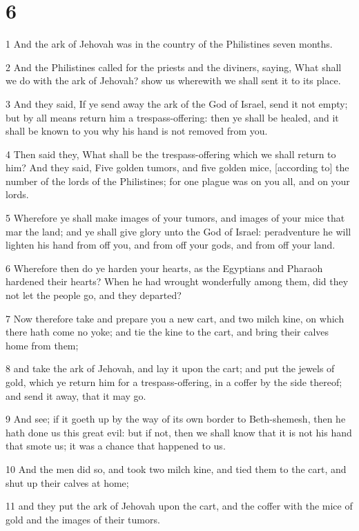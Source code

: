 \chapter{6}

\par 1 And the ark of Jehovah was in the country of the Philistines seven months.
\par 2 And the Philistines called for the priests and the diviners, saying, What shall we do with the ark of Jehovah? show us wherewith we shall sent it to its place.
\par 3 And they said, If ye send away the ark of the God of Israel, send it not empty; but by all means return him a trespass-offering: then ye shall be healed, and it shall be known to you why his hand is not removed from you.
\par 4 Then said they, What shall be the trespass-offering which we shall return to him? And they said, Five golden tumors, and five golden mice, [according to] the number of the lords of the Philistines; for one plague was on you all, and on your lords.
\par 5 Wherefore ye shall make images of your tumors, and images of your mice that mar the land; and ye shall give glory unto the God of Israel: peradventure he will lighten his hand from off you, and from off your gods, and from off your land.
\par 6 Wherefore then do ye harden your hearts, as the Egyptians and Pharaoh hardened their hearts? When he had wrought wonderfully among them, did they not let the people go, and they departed?
\par 7 Now therefore take and prepare you a new cart, and two milch kine, on which there hath come no yoke; and tie the kine to the cart, and bring their calves home from them;
\par 8 and take the ark of Jehovah, and lay it upon the cart; and put the jewels of gold, which ye return him for a trespass-offering, in a coffer by the side thereof; and send it away, that it may go.
\par 9 And see; if it goeth up by the way of its own border to Beth-shemesh, then he hath done us this great evil: but if not, then we shall know that it is not his hand that smote us; it was a chance that happened to us.
\par 10 And the men did so, and took two milch kine, and tied them to the cart, and shut up their calves at home;
\par 11 and they put the ark of Jehovah upon the cart, and the coffer with the mice of gold and the images of their tumors.
